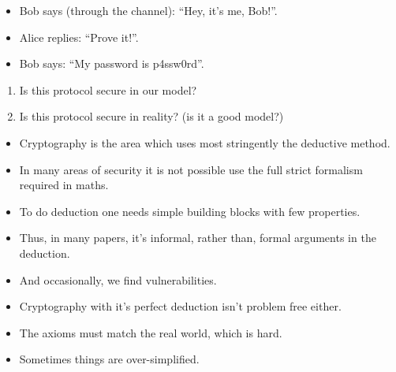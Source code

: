 \begin{frame}
  \begin{example}
    \begin{itemize}
      \item Bob says (through the channel): \enquote{Hey, it's me, Bob!}.
      \item Alice replies: \enquote{Prove it!}.
      \item Bob says: \enquote{My password is p4ssw0rd}.
    \end{itemize}
  \end{example}

  \pause

  \begin{question}
    \begin{enumerate}
      \item Is this protocol secure in our model?
      \item Is this protocol secure in reality? (\Ie is it a good model?)
    \end{enumerate}
  \end{question}
\end{frame}

\begin{frame}
  \begin{remark}
    \begin{itemize}
      \item Cryptography is the area which uses most stringently the deductive 
        method.
      \item In many areas of security it is not possible use the full strict 
        formalism required in maths.
      \item To do deduction one needs simple building blocks with few 
        properties.
      \item Thus, in many papers, it's informal, rather than, formal arguments 
        in the deduction.
      \item And occasionally, we find vulnerabilities.
    \end{itemize}
  \end{remark}
\end{frame}

\begin{frame}
  \begin{remark}
    \begin{itemize}
      \item Cryptography with it's perfect deduction isn't problem free either.
      \item The axioms must match the real world, which is hard.
      \item Sometimes things are over-simplified.
    \end{itemize}
  \end{remark}
\end{frame}

